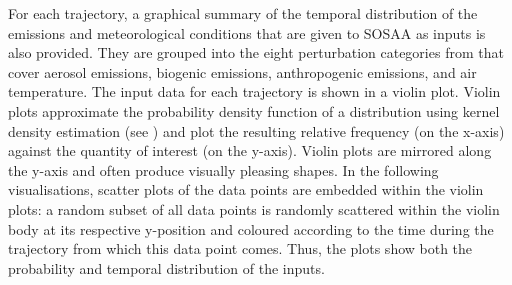 \noindent For each trajectory, a graphical summary of the temporal distribution of the emissions and meteorological conditions that are given to SOSAA as inputs is also provided. They are grouped into the eight perturbation categories from  that cover aerosol emissions, biogenic emissions, anthropogenic emissions, and air temperature. The input data for each trajectory is shown in a violin plot. Violin plots approximate the probability density function of a distribution using kernel density estimation (see ) and plot the resulting relative frequency (on the x-axis) against the quantity of interest (on the y-axis). Violin plots are mirrored along the y-axis and often produce visually pleasing shapes. In the following visualisations, scatter plots of the data points are embedded within the violin plots: a random subset of all data points is randomly scattered within the violin body at its respective y-position and coloured according to the time during the trajectory from which this data point comes. Thus, the plots show both the probability and temporal distribution of the inputs.

